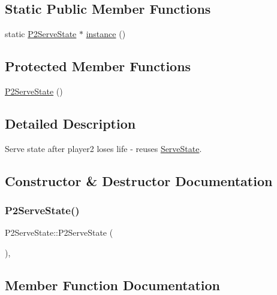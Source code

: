 \subsection*{Static Public Member Functions}
\begin{DoxyCompactItemize}
\item 
static \mbox{\hyperlink{class_p2_serve_state}{P2\+Serve\+State}} $\ast$ \mbox{\hyperlink{class_p2_serve_state_ab33721553cd862745bb721fcab45b104}{instance}} ()
\end{DoxyCompactItemize}
\subsection*{Protected Member Functions}
\begin{DoxyCompactItemize}
\item 
\mbox{\hyperlink{class_p2_serve_state_acccff2bfe7954976860ee348d745c3ee}{P2\+Serve\+State}} ()
\end{DoxyCompactItemize}


\subsection{Detailed Description}
Serve state after player2 loses life -\/ reuses \mbox{\hyperlink{class_serve_state}{Serve\+State}}. 

\subsection{Constructor \& Destructor Documentation}
\mbox{\label{class_p2_serve_state_acccff2bfe7954976860ee348d745c3ee}} 
\subsubsection{\texorpdfstring{P2ServeState()}{P2ServeState()}}
{\footnotesize\ttfamily P2\+Serve\+State\+::\+P2\+Serve\+State (\begin{DoxyParamCaption}{ }\end{DoxyParamCaption})\hspace{0.3cm}{\ttfamily [inline]}, {\ttfamily [protected]}}



\subsection{Member Function Documentation}
\mbox{\label{class_p2_serve_state_ab5cbfaef01142275fcb6aa2947c9e1b6}} 
